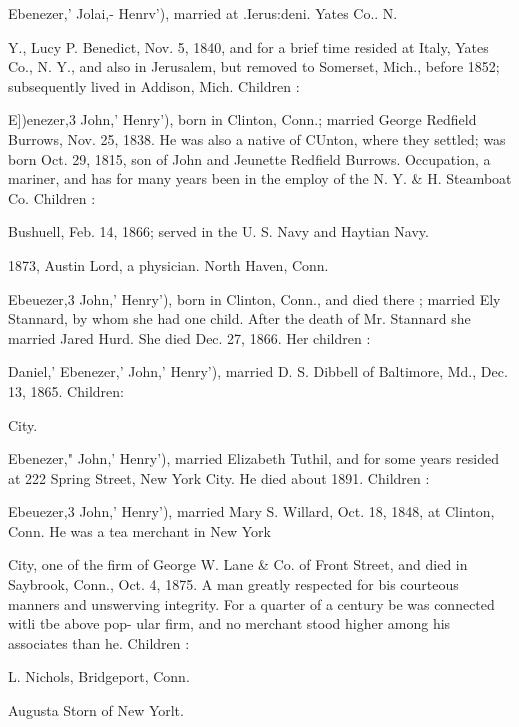 \documentclass[oneside]{book}
\begin{document}
Ebenezer,' Jolai,- Henrv'), married at .Ierus:deni. Yates Co.. N. 




Y., Lucy P. Benedict, Nov. 5, 1840, and for a brief time resided 
at Italy, Yates Co., N. Y., and also in Jerusalem, but removed 
to Somerset, Mich., before 1852; subsequently lived in Addison, 
Mich. Children : 





E])enezer,3 John,' Henry'), born in Clinton, Conn.; married 
George Redfield Burrows, Nov. 25, 1838. He was also a native 
of CUnton, where they settled; was born Oct. 29, 1815, son of 
John and Jeunette Redfield Burrows. Occupation, a mariner, 
and has for many years been in the employ of the N. Y. \& H. 
Steamboat Co. Children : 


Bushuell, Feb. 14, 1866; served in the U. S. Navy and Haytian 
Navy. 



1873, Austin Lord, a physician. North Haven, Conn. 


Ebeuezer,3 John,' Henry'), born in Clinton, Conn., and died 
there ; married Ely Stannard, by whom she had one child. After 
the death of Mr. Stannard she married Jared Hurd. She died 
Dec. 27, 1866. Her children : 




Daniel,' Ebenezer,' John,' Henry'), married D. S. Dibbell of 
Baltimore, Md., Dec. 13, 1865. Children: 


City. 


Ebenezer," John,' Henry'), married Elizabeth Tuthil, and for 
some years resided at 222 Spring Street, New York City. He 
died about 1891. Children : 




Ebeuezer,3 John,' Henry'), married Mary S. Willard, Oct. 18, 
1848, at Clinton, Conn. He was a tea merchant in New York 




City, one of the firm of George W. Lane \& Co. of Front Street, 
and died in Saybrook, Conn., Oct. 4, 1875. A man greatly 
respected for bis courteous manners and unswerving integrity. 
For a quarter of a century be was connected witli tbe above pop- 
ular firm, and no merchant stood higher among his associates 
than he. Children : 




L. Nichols, Bridgeport, Conn. 

Augusta Storn of New Yorlt. 
\end{document}

